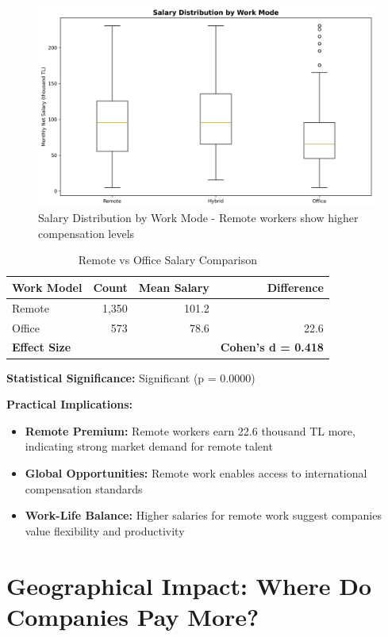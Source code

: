 \documentclass[12pt,a4paper]{article}
\begin{document}
\begin{figure}[H]
    \centering
    \includegraphics[width=\textwidth]{figures/boxplot_work_mode.png}
    \caption{Salary Distribution by Work Mode - Remote workers show higher compensation levels}
\end{figure}

\begin{table}[H]
\centering
\begin{tabular}{lrrr}
\toprule
\textbf{Work Model} & \textbf{Count} & \textbf{Mean Salary} & \textbf{Difference} \\
\midrule
Remote & 1,350 & 101.2 & \\
Office & 573 & 78.6 & 22.6 \\
\midrule
\textbf{Effect Size} & & & \textbf{Cohen's d = 0.418} \\
\bottomrule
\end{tabular}
\caption{Remote vs Office Salary Comparison}
\end{table}

\textbf{Statistical Significance:} Significant (p = 0.0000)

\textbf{Practical Implications:}
\begin{itemize}
    \item \textbf{Remote Premium:} Remote workers earn 22.6 thousand TL more, indicating strong market demand for remote talent
    \item \textbf{Global Opportunities:} Remote work enables access to international compensation standards
    \item \textbf{Work-Life Balance:} Higher salaries for remote work suggest companies value flexibility and productivity
\end{itemize}

\section{Geographical Impact: Where Do Companies Pay More?}
\end{document}

